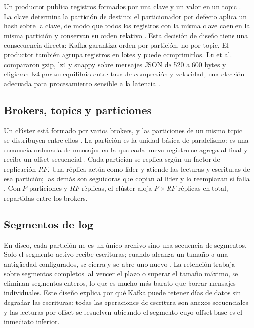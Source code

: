 \documentclass[11pt,a4paper]{article}
\begin{document}
Un productor publica registros formados por una clave y un valor en un topic \cite{raptis2023survey}. La clave determina la partición de destino: el particionador por defecto aplica un hash sobre la clave, de modo que todos los registros con la misma clave caen en la misma partición y conservan su orden relativo \cite{kafkadocs}. Esta decisión de diseño tiene una consecuencia directa: Kafka garantiza orden por partición, no por topic. El productor también agrupa registros en lotes y puede comprimirlos. Lu et al. compararon gzip, lz4 y snappy sobre mensajes JSON de 520 a 600 bytes y eligieron lz4 por su equilibrio entre tasa de compresión y velocidad, una elección adecuada para procesamiento sensible a la latencia \cite{lu2025proposal}.

\subsection{Brokers, topics y particiones}

Un clúster está formado por varios brokers, y las particiones de un mismo topic se distribuyen entre ellos \cite{zhou2024distributed}. La partición es la unidad básica de paralelismo: es una secuencia ordenada de mensajes en la que cada nuevo registro se agrega al final y recibe un offset secuencial \cite{raptis2023survey}. Cada partición se replica según un factor de replicación $RF$. Una réplica actúa como líder y atiende las lecturas y escrituras de esa partición; las demás son seguidoras que copian al líder y lo reemplazan si falla \cite{raptis2023survey}. Con $P$ particiones y $RF$ réplicas, el clúster aloja $P \times RF$ réplicas en total, repartidas entre los brokers.

\subsection{Segmentos de log}

En disco, cada partición no es un único archivo sino una secuencia de segmentos. Solo el segmento activo recibe escrituras; cuando alcanza un tamaño o una antigüedad configurados, se cierra y se abre uno nuevo \cite{kafkadocs}. La retención trabaja sobre segmentos completos: al vencer el plazo o superar el tamaño máximo, se eliminan segmentos enteros, lo que es mucho más barato que borrar mensajes individuales. Este diseño explica por qué Kafka puede retener días de datos sin degradar las escrituras: todas las operaciones de escritura son anexos secuenciales y las lecturas por offset se resuelven ubicando el segmento cuyo offset base es el inmediato inferior.
\end{document}
